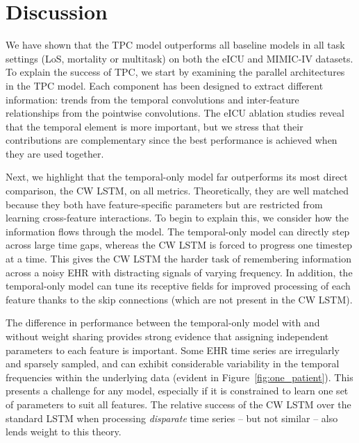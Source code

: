 \documentclass[sigconf]{acmart}
\begin{document}
\section{Discussion}
\label{discussion}
We have shown that the TPC model outperforms all baseline models in all task settings (LoS, mortality or multitask) on both the eICU and MIMIC-IV datasets. To explain the success of TPC, we start by examining the parallel architectures in the TPC model. Each component has been designed to extract different information: trends from the temporal convolutions and inter-feature relationships from the pointwise convolutions. The eICU ablation studies reveal that the temporal element is more important, but we stress that their contributions are complementary since the best performance is achieved when they are used together.

Next, we highlight that the temporal-only model far outperforms its most direct comparison, the CW LSTM, on all metrics. Theoretically, they are well matched because they both have feature-specific parameters but are restricted from learning cross-feature interactions. To begin to explain this, we consider how the information flows through the model. The temporal-only model can directly step across large time gaps, whereas the CW LSTM is forced to progress one timestep at a time. This gives the CW LSTM the harder task of remembering information across a noisy EHR with distracting signals of varying frequency. In addition, the temporal-only model can tune its receptive fields for improved processing of each feature thanks to the skip connections (which are not present in the CW LSTM).



The difference in performance between the temporal-only model with and without weight sharing provides strong evidence that assigning independent parameters to each feature is important. Some EHR time series are irregularly and sparsely sampled, and can exhibit considerable variability in the temporal frequencies within the underlying data (evident in Figure~\ref{fig:one_patient}). This presents a challenge for any model, especially if it is constrained to learn one set of parameters to suit all features. The relative success of the CW LSTM over the standard LSTM when processing \textit{disparate} time series -- but not similar -- also lends weight to this theory.
\end{document}
